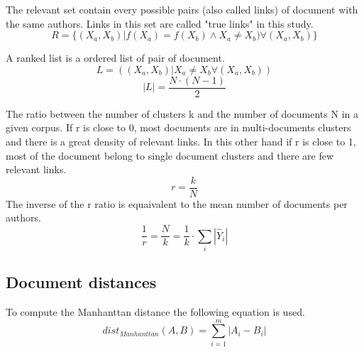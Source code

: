 \begin{definition}
  The relevant set contain every possible pairs (also called links) of document with the same authors. Links in this set are called "true links" in this study.
  \begin{equation}
    R = \{(X_a, X_b) | f(X_a) = f(X_b) \land X_a \neq X_b) \forall (X_a, X_b)\}
  \end{equation}
\end{definition}

\begin{definition}
  A ranked list is a ordered list of pair of document.
  \begin{equation}
    L = ((X_a, X_b) | X_a \neq X_b \forall (X_a, X_b))
  \end{equation}
  \begin{equation}
    |L| = \frac{N \cdot (N - 1)}{2}
  \end{equation}
\end{definition}

\begin{definition}
  The ratio between the number of clusters k and the number of documents N in a given corpus.
  If r is close to 0, most documents are in multi-documents clusters and there is a great density of relevant links.
  In this other hand if r is close to 1, most of the document belong to single document clusters and there are few relevant links.
  \begin{equation}
    r = \frac{k}{N}
  \end{equation}
  The inverse of the r ratio is equaivalent to the mean number of documents per authors.
  \begin{equation}
    \frac{1}{r} = \frac{N}{k} = \frac{1}{k} \cdot \sum_{i} |\hat{Y}_i|
  \end{equation}
\end{definition}

\subsection{Document distances}

\begin{definition}
  To compute the Manhanttan distance the following equation is used.
  \begin{equation}
    dist_{Manhanttan}(A, B) = \sum_{i=1}^{m} |A_i - B_i|
  \end{equation}
\end{definition}

